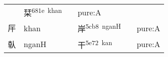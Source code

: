 \documentclass[14pt,a4paper]{scrartcl}
\begin{document}
\begin{longtable}[c]{@{}llllll@{}}
\begin{minipage}[t]{0.14\columnwidth}
\strut\end{minipage} &
\begin{minipage}[t]{0.14\columnwidth}\raggedright\strut
栞\textsuperscript{681e~khan}
\strut\end{minipage} &
\begin{minipage}[t]{0.14\columnwidth}\raggedright\strut
\strut\end{minipage} &
\begin{minipage}[t]{0.14\columnwidth}\raggedright\strut
pure:A
\strut\end{minipage}\tabularnewline
\begin{minipage}[t]{0.14\columnwidth}\raggedright\strut
厈
\strut\end{minipage} &
\begin{minipage}[t]{0.14\columnwidth}\raggedright\strut
khan
\strut\end{minipage} &
\begin{minipage}[t]{0.14\columnwidth}\raggedright\strut
\strut\end{minipage} &
\begin{minipage}[t]{0.14\columnwidth}\raggedright\strut
岸\textsuperscript{5cb8~nganH}
\strut\end{minipage} &
\begin{minipage}[t]{0.14\columnwidth}\raggedright\strut
\strut\end{minipage} &
\begin{minipage}[t]{0.14\columnwidth}\raggedright\strut
pure:A
\strut\end{minipage}\tabularnewline
\begin{minipage}[t]{0.14\columnwidth}\raggedright\strut
倝
\strut\end{minipage} &
\begin{minipage}[t]{0.14\columnwidth}\raggedright\strut
nganH
\strut\end{minipage} &
\begin{minipage}[t]{0.14\columnwidth}\raggedright\strut
\strut\end{minipage} &
\begin{minipage}[t]{0.14\columnwidth}\raggedright\strut
干\textsuperscript{5e72~kan}
\strut\end{minipage} &
\begin{minipage}[t]{0.14\columnwidth}\raggedright\strut
\strut\end{minipage} &
\begin{minipage}[t]{0.14\columnwidth}\raggedright\strut
pure:A
\strut\end{minipage}\tabularnewline
\bottomrule
\end{longtable}
\end{document}
